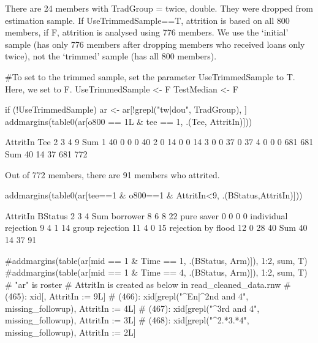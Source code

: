 There are 24 members with TradGroup = twice, double. They were dropped from estimation sample. If \textsf{UseTrimmedSample==T}, attrition is based on all 800 members, if \textsf{F}, attrition is analysed using 776 members. We use the `initial' sample (has only 776 members after dropping members who received loans only twice), not the `trimmed' sample (has all 800 members). \gobblepars
\begin{Schunk}
\begin{Sinput}
#To set to the trimmed sample, set the parameter \textsf{UseTrimmedSample} to T. Here, we set to F.
UseTrimmedSample <- F
TestMedian <- F
\end{Sinput}
\end{Schunk}
\begin{Schunk}
\begin{Sinput}
if (!UseTrimmedSample) ar <- ar[!grepl("tw|dou", TradGroup), ]
addmargins(table0(ar[o800 == 1L & tee == 1, .(Tee, AttritIn)]))
\end{Sinput}
\begin{Soutput}
     AttritIn
Tee     2   3   4   9 Sum
  1    40   0   0   0  40
  2     0  14   0   0  14
  3     0   0  37   0  37
  4     0   0   0 681 681
  Sum  40  14  37 681 772
\end{Soutput}
\end{Schunk}
Out of 772 members, there are 91 members who attrited.
\begin{Schunk}
\begin{Sinput}
addmargins(table0(ar[tee==1 & o800==1 & AttritIn<9, .(BStatus,AttritIn)]))
\end{Sinput}
\begin{Soutput}
                      AttritIn
BStatus                 2  3  4 Sum
  borrower              8  6  8  22
  pure saver            0  0  0   0
  individual rejection  9  4  1  14
  group rejection      11  4  0  15
  rejection by flood   12  0 28  40
  Sum                  40 14 37  91
\end{Soutput}
\begin{Sinput}
#addmargins(table(ar[mid == 1 & Time == 1, .(BStatus, Arm)]), 1:2, sum, T)
#addmargins(table(ar[mid == 1 & Time == 4, .(BStatus, Arm)]), 1:2, sum, T)
# "ar" is roster
# AttritIn is created as below in read_cleaned_data.rnw
# (465): xid[, AttritIn := 9L]
# (466): xid[grepl("^En|^2nd and 4", missing_followup), AttritIn := 4L]
# (467): xid[grepl("^3rd and 4", missing_followup), AttritIn := 3L]
# (468): xid[grepl("^2.*3.*4", missing_followup), AttritIn := 2L]
\end{Sinput}
\end{Schunk}
